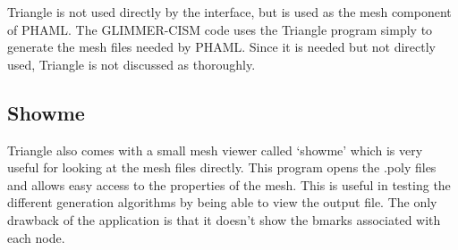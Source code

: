 Triangle is not used directly by the interface, but is used as the mesh component of PHAML.  The GLIMMER-CISM code uses the Triangle program simply to generate the mesh files needed by PHAML.  Since it is needed but not directly used, Triangle is not discussed as thoroughly.

\subsection{Showme}

Triangle also comes with a small mesh viewer called `showme' which is very useful for looking at the mesh files directly.  This program opens the .poly files and allows easy access to the properties of the mesh.  This is useful in testing the different generation algorithms by being able to view the output file.  The only drawback of the application is that it doesn't show the bmarks associated with each node. 


